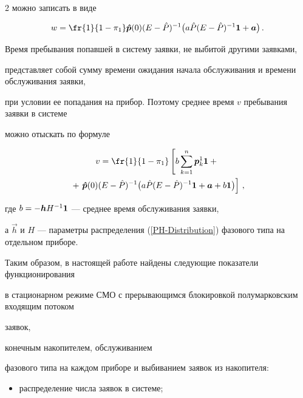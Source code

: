 \begin{multicols}{2}
можно записать в виде


$$


w=\fr{1}{ 1-\pi_1}


\vec{\hat p}(0)(E-\hat P)^{-1} \bigl( a\hat P(E-\hat P)^{-1}{\bf 1}+ \vec{a}\bigr)\,.


$$





Время пребывания попавшей в систему заявки, не выбитой другими заявками,


представляет собой сумму времени ожидания начала обслуживания и времени обслуживания заявки,


при условии ее попадания на прибор. Поэтому среднее время $v$ пребывания заявки в системе


можно отыскать по формуле


\begin{multline*}


v=\fr{1}{ 1-\pi_1}


\left[b\sum\limits_{k=1}^{n} \vec{p}^1_{k}{\bf 1}+{}\right.\\


{}+\left. \vec{\hat p}(0)(E-\hat P)^{-1} \bigl( a\hat P(E-\hat P)^{-1}{\bf 1}+ \vec{a}+ b{\bf 1}\bigr)


\right ]\,,


\end{multline*}


где $b = -\vec{h} H^{-1}{\bf 1}$ --- среднее время обслуживания заявки,


а $\vec{h}$ и $H$ --- параметры распределения (\ref{PH-Distribution}) фазового типа на отдельном приборе.





Таким образом, в настоящей работе найдены следующие показатели функционирования


в стационарном режиме СМО с прерывающимся блокировкой полумарковским входящим потоком %


заявок,


конечным накопителем, обслуживанием\linebreak


 фазового типа на каждом приборе и выбиванием заявок из накопителя:


\begin{itemize}


\label{end\stat}


\item распределение числа заявок в системе;



\end{itemize}
\end{multicols}
